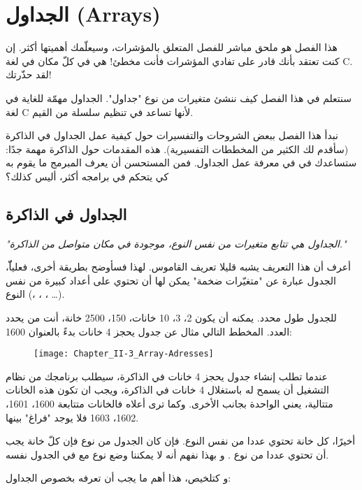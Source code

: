 \chapter{الجداول (\textenglish{Arrays})}

هذا الفصل هو ملحق مباشر للفصل المتعلق بالمؤشرات، وسيعلّمك أهميتها أكثر. إن كنت تعتقد بأنك قادر على تفادي المؤشرات فأنت مخطئ! هي في كلّ مكان في لغة \textenglish{C}. لقد حذّرتك!

سنتعلم في هذا الفصل كيف ننشئ متغيرات من نوع "جداول". الجداول مهمّة للغاية في لغة \textenglish{C} لأنها تساعد في تنظيم سلسلة من القيم.

نبدأ هذا الفصل ببعض الشروحات والتفسيرات حول كيفية عمل الجداول في الذاكرة (سأقدم لك الكثير من المخططات التفسيرية). هذه المقدمات حول الذاكرة مهمة جدًا: ستساعدك في في معرفة عمل الجداول. فمن المستحسن أن يعرف المبرمج ما يقوم به كي يتحكم في برامجه أكثر، أليس كذلك؟

\section{الجداول في الذاكرة}

\textit{"الجداول هي تتابع متغيرات من نفس النوع، موجودة في مكان متواصل من الذاكرة."}

أعرف أن هذا التعريف يشبه قليلا تعريف القاموس. لهذا فسأوضح بطريقة أخرى، فعلياّّ، الجدول عبارة عن "متغيّرات ضخمة" يمكن لها أن تحتوي على أعداد كبيرة من نفس النوع
(،
،
،
\dots).

للجدول طول محدد. يمكنه أن يكون 2، 3، 10 خانات، 150، 2500 خانة، أنت من يحدد العدد. المخطط التالي مثال عن جدول يحجز 4 خانات بدءً بالعنوان 1600:

\begin{figure}[H]
	\centering
	\texttt{[image: Chapter\_II-3\_Array-Adresses]}
\end{figure}

عندما تطلب إنشاء جدول يحجز 4 خانات في الذاكرة، سيطلب برنامجك من نظام التشغيل أن يسمح له باستغلال 4 خانات في الذاكرة، ويجب ان تكون هذه الخانات متتالية، يعني الواحدة بجانب الأخرى. وكما ترى أعلاه فالخانات متتابعة 1600، 1601، 1602، 1603 فلا يوجد "فراغ" بينها.

أخيرًا، كل خانة تحتوي عددا من نفس النوع. فإن كان الجدول من نوع
فإن كلّ خانة يجب أن تحتوي عددا من نوع
.
و بهذا نفهم أنه لا يمكننا وضع نوع
مع
في الجدول نفسه.

و كتلخيص، هذا أهم ما يجب أن تعرفه بخصوص الجداول:

